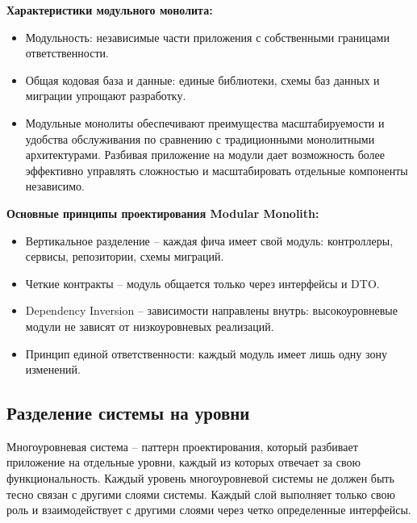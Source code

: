 \documentclass[a4paper,12pt]{report}
\begin{document}
\textbf{Характеристики модульного монолита:}
\begin{itemize}
    \item
        Модульность: независимые части приложения с собственными границами ответственности.
    \item 
        Общая кодовая база и данные: единые библиотеки, схемы баз данных и миграции упрощают разработку.
    \item
        Модульные монолиты обеспечивают преимущества масштабируемости и удобства обслуживания по сравнению 
        с традиционными монолитными архитектурами. Разбивая приложение на модули дает возможность более 
        эффективно управлять сложностью и масштабировать отдельные компоненты независимо.
\end{itemize}

\textbf{Основные принципы проектирования Modular Monolith:}
\begin{itemize}
    \item
        Вертикальное разделение -- каждая фича имеет свой модуль: контроллеры, сервисы, репозитории, схемы миграций.
    \item
        Четкие контракты -- модуль общается только через интерфейсы и DTO.
    \item
        Dependency Inversion -- зависимости направлены внутрь: высокоуровневые модули не зависят от низкоуровневых реализаций.
    \item
        Принцип единой ответственности: каждый модуль имеет лишь одну зону изменений.
\end{itemize}

\subsection{Разделение системы на уровни}

Многоуровневая система -- паттерн проектирования, который разбивает приложение на отдельные уровни, каждый из которых отвечает 
за свою функциональность. Каждый уровень многоуровневой системы не должен быть тесно связан с другими слоями системы. Каждый слой 
выполняет только свою роль и взаимодействует с другими слоями через четко определенные интерфейсы.
\end{document}
